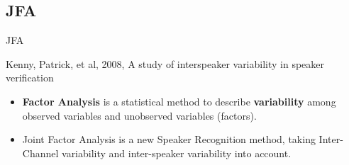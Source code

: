 

\subsection{JFA}

\begin{frame}{JFA}
  \begin{reference}{4mm}{85mm}
    Kenny, Patrick, et al, 2008,
    A study of interspeaker variability in speaker verification
  \end{reference}

  \begin{itemize}
    \item \textbf{Factor Analysis} is a statistical method to describe \textbf{variability}
      among observed variables and unobserved variables (factors).

    \item Joint Factor Analysis is a new Speaker Recognition method, taking
      Inter-Channel variability and inter-speaker variability into account.
  \end{itemize}
\end{frame}
